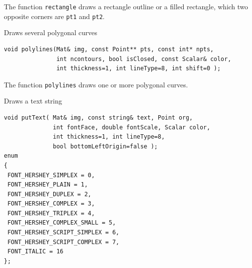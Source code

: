 The function \texttt{rectangle} draws a rectangle outline or a filled rectangle, which two opposite corners are \texttt{pt1} and \texttt{pt2}.
               

\label{polylines}
Draws several polygonal curves

\begin{lstlisting}
void polylines(Mat& img, const Point** pts, const int* npts,
               int ncontours, bool isClosed, const Scalar& color,
               int thickness=1, int lineType=8, int shift=0 );
\end{lstlisting}
\begin{description}
\end{description}

The function \texttt{polylines} draws one or more polygonal curves.

\label{putText}
Draws a text string

\begin{lstlisting}
void putText( Mat& img, const string& text, Point org,
              int fontFace, double fontScale, Scalar color,
              int thickness=1, int lineType=8,
              bool bottomLeftOrigin=false );
enum
{
 FONT_HERSHEY_SIMPLEX = 0,
 FONT_HERSHEY_PLAIN = 1,
 FONT_HERSHEY_DUPLEX = 2,
 FONT_HERSHEY_COMPLEX = 3,
 FONT_HERSHEY_TRIPLEX = 4,
 FONT_HERSHEY_COMPLEX_SMALL = 5,
 FONT_HERSHEY_SCRIPT_SIMPLEX = 6,
 FONT_HERSHEY_SCRIPT_COMPLEX = 7,
 FONT_ITALIC = 16
};
\end{lstlisting}
\begin{description}
\end{description}

